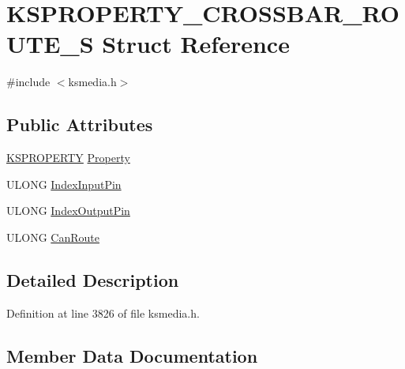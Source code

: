 \hypertarget{struct_k_s_p_r_o_p_e_r_t_y___c_r_o_s_s_b_a_r___r_o_u_t_e___s}{}\section{K\+S\+P\+R\+O\+P\+E\+R\+T\+Y\+\_\+\+C\+R\+O\+S\+S\+B\+A\+R\+\_\+\+R\+O\+U\+T\+E\+\_\+S Struct Reference}
\label{struct_k_s_p_r_o_p_e_r_t_y___c_r_o_s_s_b_a_r___r_o_u_t_e___s}


{\ttfamily \#include $<$ksmedia.\+h$>$}

\subsection*{Public Attributes}
\begin{DoxyCompactItemize}
\item 
\hyperlink{ks_8h_a4392f77c74e868d813d46c39ada4d660}{K\+S\+P\+R\+O\+P\+E\+R\+TY} \hyperlink{struct_k_s_p_r_o_p_e_r_t_y___c_r_o_s_s_b_a_r___r_o_u_t_e___s_a2e6534800abec1c664fc4c9a24f7453f}{Property}
\item 
U\+L\+O\+NG \hyperlink{struct_k_s_p_r_o_p_e_r_t_y___c_r_o_s_s_b_a_r___r_o_u_t_e___s_ad49aece064e69f3ee9ef3142486104f7}{Index\+Input\+Pin}
\item 
U\+L\+O\+NG \hyperlink{struct_k_s_p_r_o_p_e_r_t_y___c_r_o_s_s_b_a_r___r_o_u_t_e___s_a58386181a356de6c6269d1b124c786a4}{Index\+Output\+Pin}
\item 
U\+L\+O\+NG \hyperlink{struct_k_s_p_r_o_p_e_r_t_y___c_r_o_s_s_b_a_r___r_o_u_t_e___s_acea308f6937f9e9d9a459d8bb2b53430}{Can\+Route}
\end{DoxyCompactItemize}


\subsection{Detailed Description}


Definition at line 3826 of file ksmedia.\+h.



\subsection{Member Data Documentation}
